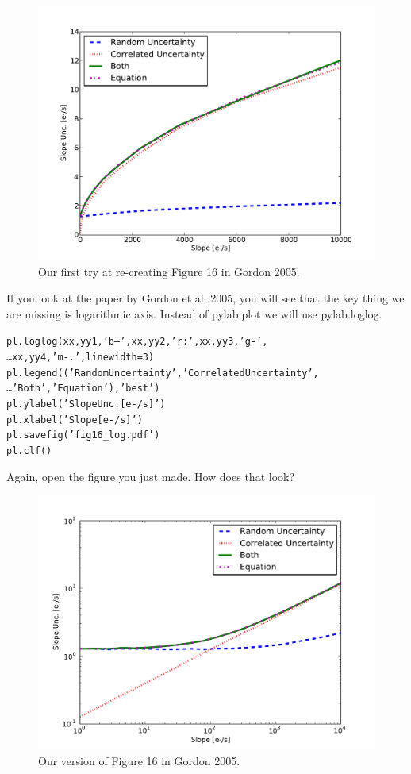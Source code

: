 \begin{figure}[tbp]
  \centering
    \includegraphics[scale=0.55]{splot.pdf}
    \caption{Our first try at re-creating Figure 16 in Gordon 2005.}
  \label{fig:splot}
\end{figure}

If you look at the paper by
Gordon et al. 2005, you will see that the key thing we are missing is
logarithmic axis.  Instead of {\sf \small pylab.plot} we will use {\sf
\small pylab.loglog}.

\begin{alltt}
\pytab pl.loglog(xx,yy1,'b--',xx,yy2,'r:',xx,yy3,'g-',  
\ldots     xx,yy4,'m-.',linewidth=3) 
\pytab pl.legend(('Random Uncertainty','Correlated Uncertainty',  
\ldots     'Both','Equation'),'best') 
\pytab pl.ylabel('Slope Unc. [e-/s]') 
\pytab pl.xlabel('Slope [e-/s]') 
\pytab pl.savefig('fig16_log.pdf')
\pytab pl.clf()
\end{alltt}

Again, open the figure you just made.  How does that look?  

\begin{figure}[tbp]
  \centering
    \includegraphics[scale=0.6]{splot_log.pdf}
    \caption{Our version of Figure 16 in Gordon 2005.}
  \label{fig:splot}
\end{figure}

